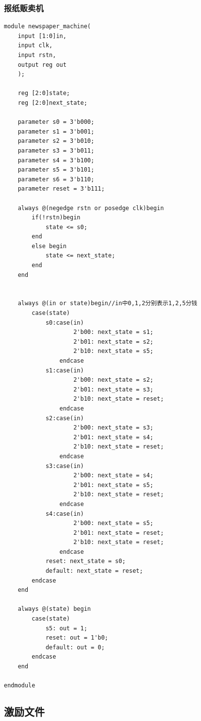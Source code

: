 \documentclass[fontset=windows,12pt]{article}
\begin{document}
        \subsubsection{报纸贩卖机}
        {\setmainfont{Courier New Bold}                               
        \begin{lstlisting}
module newspaper_machine(
    input [1:0]in,
    input clk,
    input rstn,
    output reg out
    );
    
    reg [2:0]state;
    reg [2:0]next_state;
    
    parameter s0 = 3'b000;
    parameter s1 = 3'b001;
    parameter s2 = 3'b010;
    parameter s3 = 3'b011;
    parameter s4 = 3'b100;
    parameter s5 = 3'b101;
    parameter s6 = 3'b110;
    parameter reset = 3'b111;
    
    always @(negedge rstn or posedge clk)begin
        if(!rstn)begin
            state <= s0;
        end
        else begin
            state <= next_state;
        end
    end
    
    
    always @(in or state)begin//in中0,1,2分别表示1,2,5分钱
        case(state)
            s0:case(in)
                    2'b00: next_state = s1;
                    2'b01: next_state = s2;
                    2'b10: next_state = s5;
                endcase
            s1:case(in)
                    2'b00: next_state = s2;
                    2'b01: next_state = s3;
                    2'b10: next_state = reset;
                endcase
            s2:case(in)
                    2'b00: next_state = s3;
                    2'b01: next_state = s4;
                    2'b10: next_state = reset;
                endcase
            s3:case(in)
                    2'b00: next_state = s4;
                    2'b01: next_state = s5;
                    2'b10: next_state = reset;
                endcase
            s4:case(in)
                    2'b00: next_state = s5;
                    2'b01: next_state = reset;
                    2'b10: next_state = reset;
                endcase
            reset: next_state = s0;
            default: next_state = reset;
        endcase
    end
    
    always @(state) begin
        case(state)
            s5: out = 1;
            reset: out = 1'b0;
            default: out = 0;
        endcase
    end
    
endmodule
        \end{lstlisting}}


\subsection{激励文件}
\end{document}
